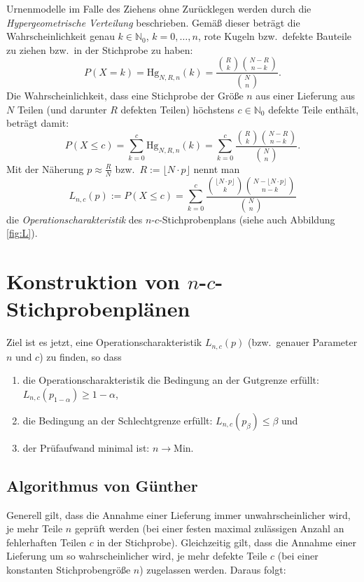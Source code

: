 \documentclass[a4paper,11pt,oneside]{article}
\begin{document}
Urnenmodelle im Falle des Ziehens ohne Zurücklegen werden durch die \emph{Hypergeometrische Verteilung} beschrieben. Gemäß dieser beträgt die Wahrscheinlichkeit genau $k\in\mathbb N_0$, $k=0,\ldots,n$, rote Kugeln bzw.\ defekte Bauteile zu ziehen bzw.\ in der Stichprobe zu haben:
$$
P(X=k)=
\mathrm{Hg}_{N,R,n}(k)=
\frac{\binom{R}{k}\binom{N-R}{n-k}}{\binom{N}{n}}.
$$
Die Wahrscheinlichkeit, dass eine Stichprobe der Größe $n$ aus einer Lieferung aus $N$ Teilen (und darunter $R$ defekten Teilen) höchstens $c\in\mathbb N_0$ defekte Teile enthält, beträgt damit:
$$
P(X\le c)=
\sum_{k=0}^c \mathrm{Hg}_{N,R,n}(k)=
\sum_{k=0}^c \frac{\binom{R}{k}\binom{N-R}{n-k}}{\binom{N}{n}}.
$$
Mit der Näherung $p\approx\frac{R}{N}$ bzw.\ $R:=\lfloor N\cdot p\rfloor$ nennt man
$$
L_{n,c}(p):=
P(X\le c)=
\sum_{k=0}^c \frac{\binom{\lfloor N\cdot p\rfloor}{k}\binom{N-\lfloor N\cdot p\rfloor}{n-k}}{\binom{N}{n}}
$$
die \emph{Operationscharakteristik} des $n$-$c$-Stichprobenplans (siehe auch Abbildung \ref{fig:L}).



\section[Konstruktion von n-c-Stichprobenplänen]{Konstruktion von $n$-$c$-Stichprobenplänen}

Ziel ist es jetzt, eine Operationscharakteristik $L_{n,c}(p)$ (bzw.\ genauer Parameter $n$ und $c$) zu finden, so dass

\begin{enumerate}
\item
die Operationscharakteristik die Bedingung an der Gutgrenze erfüllt:\\
$L_{n,c}(p_{1-\alpha})\ge1-\alpha$,
\item
die Bedingung an der Schlechtgrenze erfüllt: $L_{n,c}(p_\beta)\le\beta$ und
\item
der Prüfaufwand minimal ist: $n\to\mathrm{Min}$.
\end{enumerate}

\subsection{Algorithmus von Günther}

Generell gilt, dass die Annahme einer Lieferung immer unwahrscheinlicher wird, je mehr Teile $n$ geprüft werden (bei einer festen maximal zulässigen Anzahl an fehlerhaften Teilen $c$ in der Stichprobe). Gleichzeitig gilt, dass die Annahme einer Lieferung um so wahrscheinlicher wird, je mehr defekte Teile $c$ (bei einer konstanten Stichprobengröße $n$) zugelassen werden. Daraus folgt:
\end{document}
